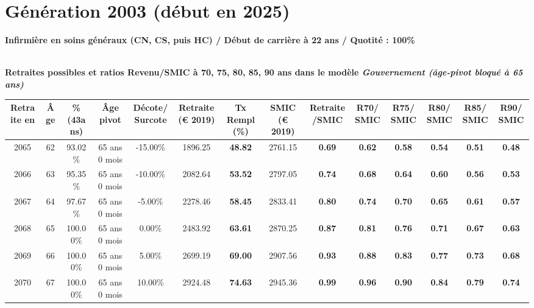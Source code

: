 \newpage 
 
\section{Génération 2003 (début en 2025)\label{Infirmier_100_22_2003_0}} 
 
{\bf \noindent Infirmière en soins généraux (CN, CS, puis HC) / Début de carrière à 22 ans / Quotité : 100\%}  ~ 

 ~\\{\bf \noindent Retraites possibles et ratios Revenu/SMIC à 70, 75, 80, 85, 90 ans dans le modèle \emph{Gouvernement (âge-pivot bloqué à 65 ans)}}  
 
\begin{adjustbox}{max width=\textwidth} 
\begin{tabular}[htb]{|c|c||c|c|c||c|c||c|c||c|c|c|c|c|} 
\hline 
 Retraite en &  Âge &  \%(43ans) &  Âge pivot &  Décote/Surcote &  Retraite (\euro{} 2019) &  Tx Rempl(\%) &  SMIC (\euro{} 2019) &  Retraite/SMIC &  R70/SMIC &  R75/SMIC &  R80/SMIC &  R85/SMIC &  R90/SMIC \\ 
\hline \hline 
 2065 &  62 &  93.02\% &  65 ans 0 mois &  -15.00\% &  1896.25 &  {\bf 48.82} &  2761.15 &  {\bf {\color{red} 0.69}} &  {\bf {\color{red} 0.62}} &  {\bf {\color{red} 0.58}} &  {\bf {\color{red} 0.54}} &  {\bf {\color{red} 0.51}} &  {\bf {\color{red} 0.48}} \\ 
\hline 
 2066 &  63 &  95.35\% &  65 ans 0 mois &  -10.00\% &  2082.64 &  {\bf 53.52} &  2797.05 &  {\bf {\color{red} 0.74}} &  {\bf {\color{red} 0.68}} &  {\bf {\color{red} 0.64}} &  {\bf {\color{red} 0.60}} &  {\bf {\color{red} 0.56}} &  {\bf {\color{red} 0.53}} \\ 
\hline 
 2067 &  64 &  97.67\% &  65 ans 0 mois &  -5.00\% &  2278.46 &  {\bf 58.45} &  2833.41 &  {\bf {\color{red} 0.80}} &  {\bf {\color{red} 0.74}} &  {\bf {\color{red} 0.70}} &  {\bf {\color{red} 0.65}} &  {\bf {\color{red} 0.61}} &  {\bf {\color{red} 0.57}} \\ 
\hline 
 2068 &  65 &  100.00\% &  65 ans 0 mois &  0.00\% &  2483.92 &  {\bf 63.61} &  2870.25 &  {\bf {\color{red} 0.87}} &  {\bf {\color{red} 0.81}} &  {\bf {\color{red} 0.76}} &  {\bf {\color{red} 0.71}} &  {\bf {\color{red} 0.67}} &  {\bf {\color{red} 0.63}} \\ 
\hline 
 2069 &  66 &  100.00\% &  65 ans 0 mois &  5.00\% &  2699.19 &  {\bf 69.00} &  2907.56 &  {\bf {\color{red} 0.93}} &  {\bf {\color{red} 0.88}} &  {\bf {\color{red} 0.83}} &  {\bf {\color{red} 0.77}} &  {\bf {\color{red} 0.73}} &  {\bf {\color{red} 0.68}} \\ 
\hline 
 2070 &  67 &  100.00\% &  65 ans 0 mois &  10.00\% &  2924.48 &  {\bf 74.63} &  2945.36 &  {\bf {\color{red} 0.99}} &  {\bf {\color{red} 0.96}} &  {\bf {\color{red} 0.90}} &  {\bf {\color{red} 0.84}} &  {\bf {\color{red} 0.79}} &  {\bf {\color{red} 0.74}} \\ 
\hline 
\hline 
\end{tabular} 
\end{adjustbox} 
 
